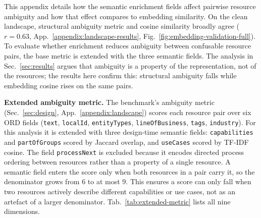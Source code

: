 This appendix details how the semantic enrichment fields affect pairwise resource ambiguity and how that effect compares to embedding similarity. On the clean landscape, structural ambiguity metric and cosine similarity broadly agree ($r=0.63$, App.~\ref{appendix:landscape-results}, Fig.~\ref{fig:embedding-validation-full}). To evaluate whether enrichment reduces ambiguity between confusable resource pairs, the base metric is extended with the three semantic fields. The analysis in Sec.~\ref{sec:results} argues that ambiguity is a property of the representation, not of the resources; the results here confirm this: structural ambiguity falls while embedding cosine rises on the same pairs.

\textbf{Extended ambiguity metric.} The benchmark's ambiguity metric (Sec.~\ref{sec:design}, App.~\ref{appendix:landscape}) scores each resource pair over six ORD fields (\texttt{text}, \texttt{localId}, \texttt{entityTypes}, \texttt{lineOfBusiness}, \texttt{tags}, \texttt{industry}). For this analysis it is extended with three design-time semantic fields: \texttt{capabilities} and \texttt{partOfGroups} scored by Jaccard overlap, and \texttt{useCases} scored by TF-IDF cosine. The field \texttt{processNext} is excluded because it encodes directed process ordering between resources rather than a property of a single resource. A semantic field enters the score only when both resources in a pair carry it, so the denominator grows from 6 to at most 9. This ensures a score can only fall when two resources actively describe different capabilities or use cases, not as an artefact of a larger denominator. Tab.~\ref{tab:extended-metric} lists all nine dimensions.

